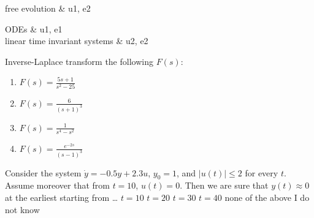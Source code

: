 \documentclass{article}
\begin{document}
\def\QUESTIONAUTHOREMAIL{myemail@something.edu}
\def\QUESTIONDISCLOSABILITY{everybody}
\def\QUESTIONSOLUTIONDISCLOSABILITY{everybody}


\ifshowcontentsmap
\begin{ContentsMap}
	\begin{DevelopedContents}
		free evolution & u1, e2 \\
	\end{DevelopedContents}
	\begin{PrerequisiteContents}
		ODEs & u1, e1 \\
		linear time invariant systems & u2, e2 \\
	\end{PrerequisiteContents}
\end{ContentsMap}
\fi


\begin{IndexedQuestion}
	\QuestionBody
	{
		Inverse-Laplace transform the following $F(s)$:
		\begin{enumerate}[{\theQuestionsCounter}-1.]
			\item $F(s) = \frac{5s+1}{s^2-25}$
			\item $F(s) = \frac{6}{(s+1)^3}$
			\item $F(s) = \frac{1}{s^4-s^2}$
			\item $F(s) = \frac{e^{-2s}}{(s-1)^3}$
		\end{enumerate}
	}
\end{IndexedQuestion}


\begin{IndexedQuestion}
\QuestionBody
{
	Consider the system $\dot{y} = -0.5 y + 2.3 u$, $y_{0} = 1$, and $\left| u(t) \right| \leq 2$ for every $t$. Assume moreover that from $t = 10$, $u(t) = 0$. Then we are sure that $y(t) \approx 0$ at the earliest starting from \ldots
}
\QuestionPotentialAnswers
{
	\answer $t = 10$
	\correctanswer $t = 20$
	\answer $t = 30$
	\answer $t = 40$
	\answer none of the above
	\answer I do not know
}
\end{IndexedQuestion}
\end{document}
